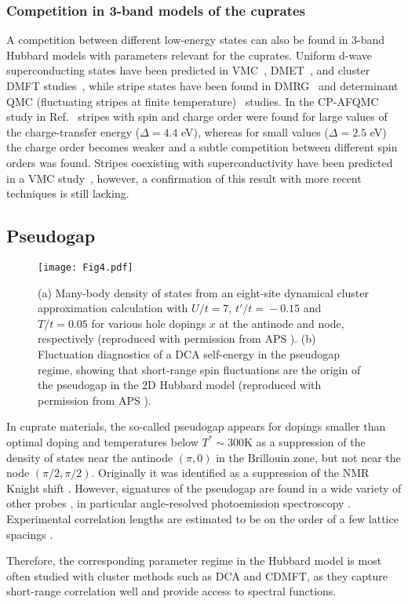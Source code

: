 \documentclass{ar-1col}
\begin{document}
\subsubsection{Competition in 3-band models of the cuprates}
\label{sec:competitionmultiband}
A competition between different low-energy states can also be found in 3-band Hubbard models with parameters relevant for the cuprates. Uniform d-wave superconducting states have been predicted in VMC~\cite{Yanagisawa01,Yanagisawa09,Weber14,Zegrodnik19, Biborski20,Zegrodnik20}, DMET~\cite{Cui20}, and cluster DMFT studies~\cite{Weber12}, while stripe states have been found in DMRG~\cite{White15} and determinant QMC (fluctuating stripes at finite temperature)~\cite{Huang17} studies. In the CP-AFQMC study in Ref.~\cite{Chiciak20}  stripes with spin and charge order were found for large values of the charge-transfer energy ($\Delta=4.4$ eV), whereas for small values ($\Delta=2.5$ eV) the charge order becomes weaker and a subtle competition between different spin orders was found. 
Stripes coexisting with superconductivity have been predicted in a VMC study~\cite{Yanagisawa09}, however, a confirmation of this result with more recent techniques is still lacking. 




\subsection{Pseudogap}
\label{sec:pseudogap}

\begin{figure}[t]
   \texttt{[image: Fig4.pdf]}
   \caption{\label{fig:pg} (a) Many-body density of states from an eight-site dynamical cluster approximation calculation with $U/t\!=\!7$, $t'/t\!=\!-0.15$ and $T/t\!=\!0.05$ for various hole dopings $x$ at the antinode and node, respectively (reproduced with permission from APS \cite{Lin10}). (b) Fluctuation diagnostics of a DCA self-energy in the pseudogap regime, showing that short-range spin fluctuations are the origin of the pseudogap in the 2D Hubbard model (reproduced with permission from APS \cite{Gunnarsson15}).}
\end{figure}
In cuprate materials, the so-called pseudogap appears for dopings smaller than optimal doping and temperatures below $T^* \sim 300$K as a suppression of the density of states near the antinode $(\pi,0)$ in the Brillouin zone, but not near the node $(\pi/2,\pi/2)$. Originally it was identified as a suppression of the NMR Knight shift \cite{Alloul89}. However, signatures of the pseudogap are found in a wide variety of other probes \cite{Huefner08}, in particular angle-resolved photoemission spectroscopy \cite{Kanigel06,Shen05}.
Experimental correlation lengths are estimated to be on the order of a few lattice spacings \cite{Kastner98}.\begin{marginnote}
\end{marginnote}Therefore, the corresponding parameter regime in the Hubbard model is most often studied with cluster methods such as DCA and CDMFT, as they capture short-range correlation well and provide access to spectral functions.
\end{document}

